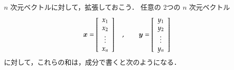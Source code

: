                     $n$ 次元ベクトルに対して，拡張しておこう．
                    任意の 2つの $n$ 次元ベクトル
                    \begin{equation*}
                        \boldsymbol{x} =
                        \left[
                            \begin{array}{c}
                                x_{1} \\
                                x_{2} \\
                                \vdots \\
                                x_{n} \\
                           \end{array}
                        \right]\quad , \qquad
                        \boldsymbol{y} =
                        \left[
                            \begin{array}{c}
                                y_{1} \\
                                y_{2} \\
                                \vdots \\
                                y_{n} \\
                           \end{array}
                        \right]
                    \end{equation*}
                    に対して，これらの和は，成分で書くと次のようになる．
